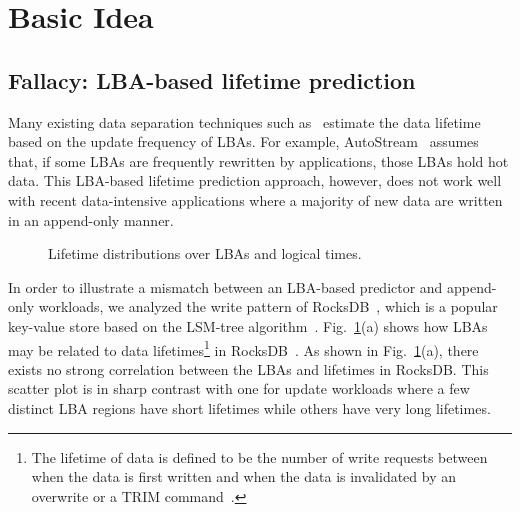 \section{Basic Idea}
\subsection{Fallacy: LBA-based lifetime prediction}
Many existing data separation techniques such as~\cite{AutoStream, HotCold} 
estimate the data lifetime based on the update frequency of LBAs.  
For example, AutoStream~\cite{AutoStream} assumes that, if
some LBAs are frequently rewritten by applications, those LBAs hold hot data.
This LBA-based lifetime prediction 
approach, however, does not work well with recent data-intensive 
applications where a majority of
new data are written in an append-only manner.  

\begin{figure}[t]
	\centering
	\vspace{-10pt}
	\caption{
		Lifetime distributions over LBAs and logical times.}
		\label{fig:lba_lifetime}
	\vspace{-15pt}
\end{figure}


In order to illustrate a mismatch between an LBA-based predictor and 
append-only workloads, we analyzed the write pattern of 
RocksDB~\cite{RocksDB}, which is a
popular key-value store based on the LSM-tree algorithm~\cite{LSM}.
Fig.~\ref{fig:lba_lifetime}(a) shows how LBAs may be related 
to data lifetimes\footnote{The lifetime of data is defined to be 
the number of write requests between when the data is first written 
and when the data is invalidated by an overwrite or a TRIM command~\cite{TRIM}.}
in RocksDB~\cite{RocksDB}.  
As shown in Fig.~\ref{fig:lba_lifetime}(a), 
there exists no strong correlation between the LBAs and lifetimes in RocksDB.  
This scatter plot is in sharp contrast with one for update workloads 
where a few distinct LBA regions have short lifetimes while others 
have very long lifetimes.


